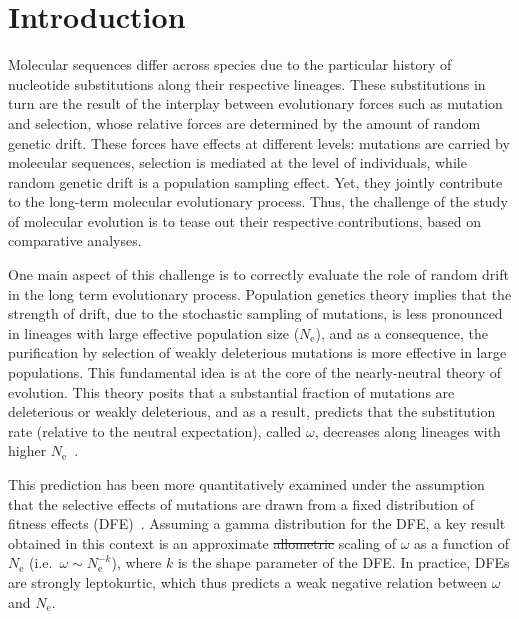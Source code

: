 \documentclass[authoryear]{elsarticle} %
\newcommand{\Ne}{N_{\text{e}}} %
\providecommand{\DIFdeltex}[1]{{\protect\color{red}\sout{#1}}}                      %
\providecommand{\DIFdelbegin}{} %
\providecommand{\DIFdelend}{} %
\providecommand{\DIFdel}[1]{\texorpdfstring{\DIFdeltex{#1}}{}} %
\begin{document}
\section{Introduction}
Molecular sequences differ across species due to the particular history of nucleotide {substitutions} along their respective lineages.
These {substitutions} in turn are the result of the interplay between evolutionary forces such as mutation and selection, whose relative forces are determined by the amount of random {genetic drift}.
These forces have effects at different levels: mutations are carried by molecular sequences, selection is mediated at the level of individuals, while random {genetic drift} is a population sampling effect.
Yet, they jointly contribute to the long-term molecular evolutionary process.
Thus, the challenge of the study of molecular evolution is to tease out their respective contributions, based on comparative analyses.

One main aspect of this challenge is to correctly evaluate the role of random drift in the long term evolutionary process.
Population genetics theory implies that the strength of drift, due to the stochastic sampling of mutations, is less pronounced in lineages with large {effective population size} ($\Ne$), and as a consequence, the purification by selection of weakly deleterious mutations is more effective in large populations.
This fundamental idea is at the core of the {nearly-neutral} theory of evolution.
This theory posits that a substantial fraction of mutations are deleterious or weakly deleterious, and as a result, predicts that the {substitution} rate (relative to the {neutral} expectation), called $\omega$, decreases along lineages with higher $\Ne$~\citep{Ohta1972, Ohta1992}.

This prediction has been more quantitatively examined under the assumption that the selective effects of mutations are drawn from a fixed distribution of fitness effects ({DFE})~\citep{Kimura1979, Welch2008}.
Assuming a gamma distribution for the {DFE}, a key result obtained in this context is an approximate \DIFdelbegin \DIFdel{allometric }\DIFdelend scaling of $\omega$ as a function of $\Ne$ (i.e.~$\omega \sim \Ne^{-k}$), where $k$ is the shape parameter of the {DFE}.
In practice, DFEs are strongly leptokurtic, which thus predicts a weak negative relation between $\omega$ and $\Ne$.
\end{document}
